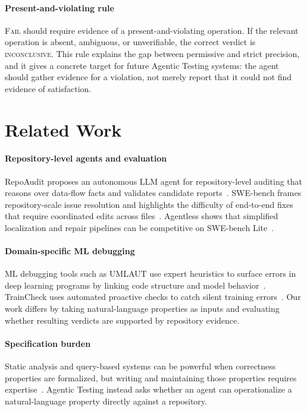 \documentclass[11pt]{article}
\begin{document}
\paragraph{Present-and-violating rule}
\textsc{Fail} should require evidence of a present-and-violating operation.
If the relevant operation is absent, ambiguous, or unverifiable, the correct verdict is \textsc{inconclusive}.
This rule explains the gap between permissive and strict precision, and it gives a concrete target for future Agentic Testing systems: the agent should gather evidence for a violation, not merely report that it could not find evidence of satisfaction.

\section{Related Work}

\paragraph{Repository-level agents and evaluation}
RepoAudit proposes an autonomous LLM agent for repository-level auditing that reasons over data-flow facts and validates candidate reports~\citep{guo2025repoaudit}.
SWE-bench frames repository-scale issue resolution and highlights the difficulty of end-to-end fixes that require coordinated edits across files~\citep{jimenez2024swebench}.
Agentless shows that simplified localization and repair pipelines can be competitive on SWE-bench Lite~\citep{xia2024agentless}.

\paragraph{Domain-specific ML debugging}
ML debugging tools such as UMLAUT use expert heuristics to surface errors in deep learning programs by linking code structure and model behavior~\citep{schoop2021umlaut}.
TrainCheck uses automated proactive checks to catch silent training errors~\citep{traincheck}.
Our work differs by taking natural-language properties as inputs and evaluating whether resulting verdicts are supported by repository evidence.

\paragraph{Specification burden}
Static analysis and query-based systems can be powerful when correctness properties are formalized, but writing and maintaining those properties requires expertise~\citep{cousot1979systematic,nielson1999principles,codeql}.
Agentic Testing instead asks whether an agent can operationalize a natural-language property directly against a repository.
\end{document}
